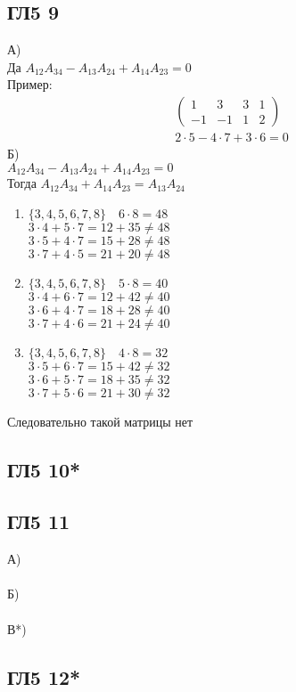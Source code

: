 		\subsection{ГЛ5 9}
		А)\\
		Да $A_{12} A_{34} - A_{13} A_{24} + A_{14} A_{23} = 0$\\
		Пример:
		\begin{gather*}
			\begin{pmatrix}
				1 & 3 & 3 & 1\\
				-1 & -1 & 1 & 2
			\end{pmatrix}\\
			2 \cdot 5 - 4 \cdot 7 + 3 \cdot 6 = 0
		\end{gather*}
		Б)\\
		$A_{12} A_{34} - A_{13} A_{24} + A_{14} A_{23} = 0$\\
		Тогда $A_{12} A_{34} + A_{14} A_{23} = A_{13} A_{24}$
		\begin{enumerate}
			\item $\{3,4,5,6,7,8\} \quad 6 \cdot 8 = 48 $\\
			$3 \cdot 4 + 5 \cdot 7 = 12 + 35 \ne 48$\\
			$3 \cdot 5 + 4 \cdot 7 = 15 + 28 \ne 48$\\
			$3 \cdot 7 + 4 \cdot 5 = 21 + 20 \ne 48$\\
			\item $\{3,4,5,6,7,8\} \quad 5 \cdot 8 = 40 $\\
			$3 \cdot 4 + 6 \cdot 7 = 12 + 42 \ne 40$\\
			$3 \cdot 6 + 4 \cdot 7 = 18 + 28 \ne 40$\\
			$3 \cdot 7 + 4 \cdot 6 = 21 + 24 \ne 40$\\
			\item $\{3,4,5,6,7,8\} \quad 4 \cdot 8 = 32 $\\
			$3 \cdot 5 + 6 \cdot 7 = 15 + 42 \ne 32$\\
			$3 \cdot 6 + 5 \cdot 7 = 18 + 35 \ne 32$\\
			$3 \cdot 7 + 5 \cdot 6 = 21 + 30 \ne 32$\\		
		\end{enumerate}
		Следовательно такой матрицы нет
	
		\subsection{ГЛ5 10*}
		
		\subsection{ГЛ5 11}
		А)\\
		\\
		Б)\\
		\\
		В*)\\
		
		\subsection{ГЛ5 12*}